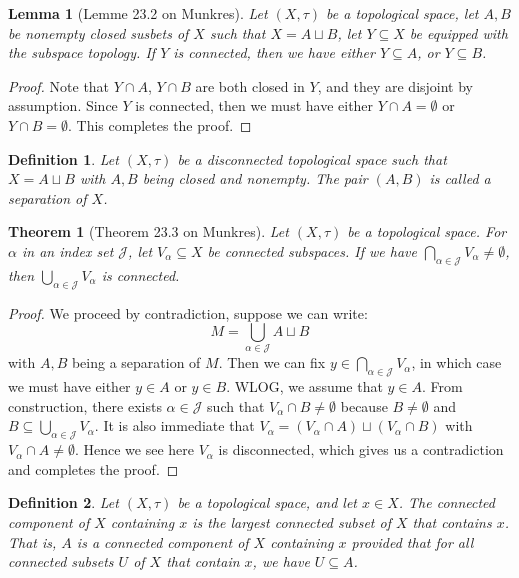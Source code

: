 \documentclass[11pt]{book}
\theoremstyle{break}
\theoremstyle{break}
\newtheorem{thm}{Theorem}[section]
\newtheorem{lem}{Lemma}[thm]
\newtheorem{defn}{Definition}[corL]
\begin{document}
\begin{lem}[Lemme 23.2 on Munkres]
Let $(X,\tau)$ be a topological space, let $A,B$ be nonempty closed susbets of $X$ such that $X = A\sqcup B$, let $Y\subseteq X$ be equipped with the subspace topology. If $Y$ is connected, then we have either $Y\subseteq A$, or $Y \subseteq B$.
\end{lem}
\begin{proof}
Note that $Y\cap A$, $Y\cap B$ are both closed in $Y$, and they are disjoint by assumption. Since $Y$ is connected, then we must have either $Y\cap A = \emptyset$ or $Y\cap  B = \emptyset$. This completes the proof. 
\end{proof}

\begin{defn}
Let $(X,\tau)$ be a disconnected topological space such that $X = A\sqcup B$ with $A,B$ being closed and nonempty. The pair $(A,B)$ is called a separation of $X$.
\end{defn}

\begin{thm}[Theorem 23.3 on Munkres]
Let $(X,\tau)$ be a topological space. For $\alpha$ in an index set $\mathcal{J}$, let $V_\alpha\subseteq X$ be connected subspaces. If we have $\bigcap_{\alpha \in \mathcal{J}}V_\alpha \neq \emptyset$, then $\bigcup_{\alpha \in \mathcal{J}}V_\alpha$ is connected.
\end{thm}
\begin{proof}
We proceed by contradiction, suppose we can write: $$M = \bigcup_{\alpha \in \mathcal{J}} A\sqcup B$$
with $A,B$ being a separation of $M$. Then we can fix $y \in \bigcap_{\alpha \in \mathcal{J}}V_\alpha$, in which case we must have either $y \in A$ or $y \in B$. WLOG, we assume that $y \in A$. From construction, there exists $\alpha \in \mathcal{J}$ such that $V_\alpha \cap B \neq \emptyset$ because $B \neq \emptyset$ and $B \subseteq \bigcup_{\alpha \in \mathcal{J}}V_\alpha$. It is also immediate that $V_\alpha = (V_\alpha \cap A) \sqcup (V_\alpha\cap B)$ with $V_\alpha \cap A \neq \emptyset$. Hence we see here $V_\alpha$ is disconnected, which gives us a contradiction and completes the proof. 
\end{proof}

\begin{defn}
Let $(X,\tau)$ be a topological space, and let $x \in X$. The connected component of $X$ containing $x$ is the largest connected subset of $X$ that contains $x$. That is, $A$ is a connected component of $X$ containing $x$ provided that for all connected subsets $U$ of $X$ that contain $x$, we have $U \subseteq A$. 
\end{defn}
\end{document}
